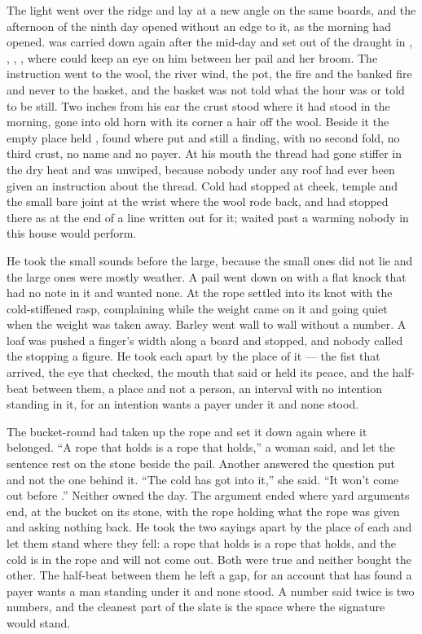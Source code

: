 The light went over the ridge and lay at a new angle on the same boards, and the afternoon of the ninth day opened without an edge to it, as the morning had opened.  was carried down again after the mid-day and set out of the draught in , , , , where  could keep an eye on him between her pail and her broom. The instruction went to the wool, the river wind, the pot, the fire and the banked fire and never to the basket, and the basket was not told what the hour was or told to be still. Two inches from his ear the crust stood where it had stood in the morning, gone into old horn with its corner a hair off the wool. Beside it the empty place held , found where put and still a finding, with no second fold, no third crust, no name and no payer. At his mouth the thread had gone stiffer in the dry heat and was unwiped, because nobody under any roof had ever been given an instruction about the thread. Cold had stopped at cheek, temple and the small bare joint at the wrist where the wool rode back, and had stopped there as at the end of a line written out for it;  waited past a warming nobody in this house would perform.

He took the small sounds before the large, because the small ones did not lie and the large ones were mostly weather. A pail went down on  with a flat knock that had no note in it and wanted none. At  the rope settled into its knot with the cold-stiffened rasp, complaining while the weight came on it and going quiet when the weight was taken away. Barley went wall to wall without a number. A loaf was pushed a finger's width along a board and stopped, and nobody called the stopping a figure. He took each apart by the place of it --- the fist that arrived, the eye that checked, the mouth that said or held its peace, and the half-beat between them, a place and not a person, an interval with no intention standing in it, for an intention wants a payer under it and none stood.

The bucket-round had taken up the rope and set it down again where it belonged. “A rope that holds is a rope that holds,” a woman said, and let the sentence rest on the stone beside the pail. Another answered the question put and not the one behind it. “The cold has got into it,” she said. “It won't come out before .” Neither owned the day. The argument ended where yard arguments end, at the bucket on its stone, with the rope holding what the rope was given and asking nothing back. He took the two sayings apart by the place of each and let them stand where they fell: a rope that holds is a rope that holds, and the cold is in the rope and will not come out. Both were true and neither bought the other. The half-beat between them he left a gap, for an account that has found a payer wants a man standing under it and none stood. A number said twice is two numbers, and the cleanest part of the slate is the space where the signature would stand.

